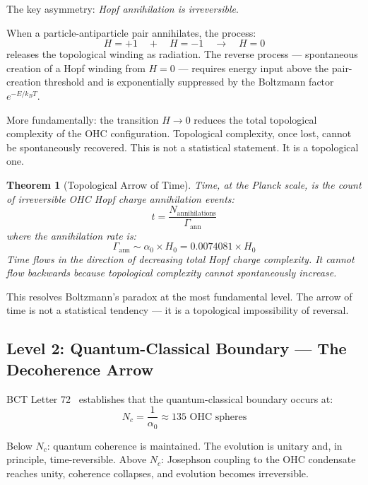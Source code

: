 \documentclass[aps,prl,twocolumn,superscriptaddress,floatfix]{revtex4-2}
\newtheorem{theorem}{Theorem}
\newcommand{\azero}{\alpha_0}
\newcommand{\Nc}{N_c}
\begin{document}
The key asymmetry: \emph{Hopf annihilation is irreversible}.

When a particle-antiparticle pair annihilates, the process:
\begin{equation}
H = +1 \quad + \quad H = -1 \quad \longrightarrow \quad H = 0
\end{equation}
releases the topological winding as radiation. The reverse 
process --- spontaneous creation of a Hopf winding from 
$H = 0$ --- requires energy input above the pair-creation 
threshold and is exponentially suppressed by the Boltzmann 
factor $e^{-E/k_BT}$.

More fundamentally: the transition $H \to 0$ reduces the 
total topological complexity of the OHC configuration. 
Topological complexity, once lost, cannot be spontaneously 
recovered. This is not a statistical statement. It is a 
topological one.

\begin{theorem}[Topological Arrow of Time]
Time, at the Planck scale, is the count of irreversible 
OHC Hopf charge annihilation events:
\begin{equation}
t = \frac{N_{\mathrm{annihilations}}}{\Gamma_{\mathrm{ann}}}
\end{equation}
where the annihilation rate is:
\begin{equation}
\Gamma_{\mathrm{ann}} \sim \azero \times H_0 
= 0.0074081 \times H_0
\end{equation}
Time flows in the direction of decreasing total Hopf 
charge complexity. It cannot flow backwards because 
topological complexity cannot spontaneously increase.
\end{theorem}

This resolves Boltzmann's paradox at the most fundamental 
level. The arrow of time is not a statistical tendency 
--- it is a topological impossibility of reversal.

\subsection{Level 2: Quantum-Classical Boundary --- The Decoherence Arrow}

BCT Letter 72~\cite{BCT_L72} establishes that the 
quantum-classical boundary occurs at:
\begin{equation}
\Nc = \frac{1}{\azero} \approx 135 \text{ OHC spheres}
\end{equation}

Below $\Nc$: quantum coherence is maintained. The evolution 
is unitary and, in principle, time-reversible. Above $\Nc$: 
Josephson coupling to the OHC condensate reaches unity, 
coherence collapses, and evolution becomes irreversible.
\end{document}
